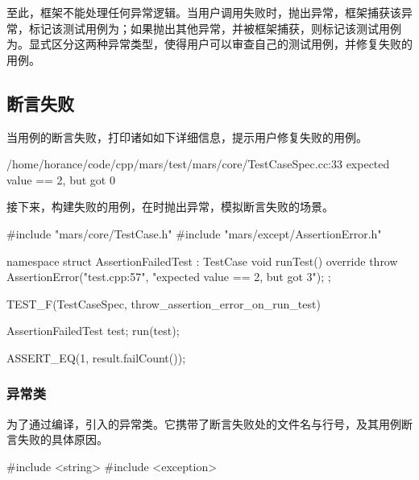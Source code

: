 \begin{content}

至此，框架不能处理任何异常逻辑。当用户调用失败时，抛出异常，框架捕获该异常，标记该测试用例为；如果抛出其他异常，并被框架捕获，则标记该测试用例为。显式区分这两种异常类型，使得用户可以审查自己的测试用例，并修复失败的用例。

\subsection{断言失败}

当用例的断言失败，打印诸如如下详细信息，提示用户修复失败的用例。

\begin{leftbar}
 \begin{python}[caption={测试失败}]
/home/horance/code/cpp/mars/test/mars/core/TestCaseSpec.cc:33
expected value == 2, but got 0
 \end{python}
\end{leftbar}

接下来，构建失败的用例，在时抛出异常，模拟断言失败的场景。

\begin{leftbar}
 \begin{c++}[caption={\ttfamily{test/mars/TestCaseSpec.cc}}]
#include "mars/core/TestCase.h"
#include "mars/except/AssertionError.h"

namespace {
  struct AssertionFailedTest : TestCase {
    void runTest() override {
      throw AssertionError("test.cpp:57", "expected value == 2, but got 3");
    }
  };
}

TEST_F(TestCaseSpec, throw_assertion_error_on_run_test) {
  AssertionFailedTest test;
  run(test);

  ASSERT_EQ(1, result.failCount());
}
 \end{c++}
\end{leftbar}

\subsubsection{异常类}

为了通过编译，引入的异常类。它携带了断言失败处的文件名与行号，及其用例断言失败的具体原因。

\begin{leftbar}
 \begin{c++}[caption={\ttfamily{include/mars/except/AssertionError.h}}]
#include <string>
#include <exception>


\end{c++}
\end{leftbar}
\end{content}
